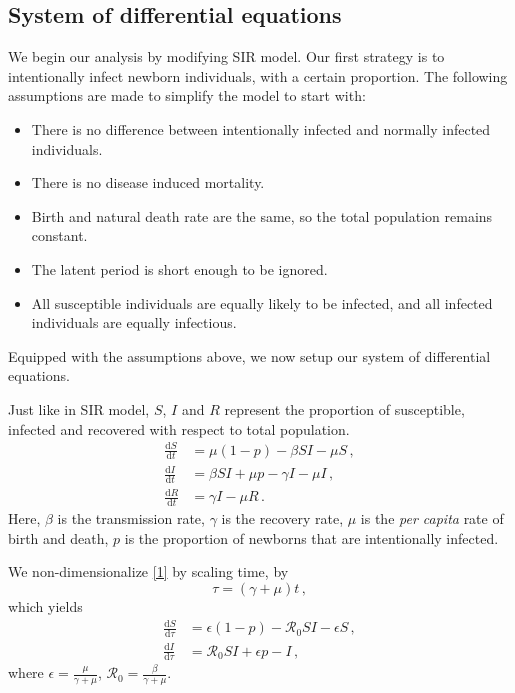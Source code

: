 \documentclass[12pt]{article}
\newcommand\dbyd[2]{\frac{\mathrm d{#1}}{\mathrm d{#2}}}
\newcommand{\R}{\mathcal{R}}
\begin{document}
\subsection{System of differential equations}
We begin our analysis by modifying SIR model. Our first strategy is to intentionally infect newborn individuals, with a certain proportion.  The following assumptions are made to simplify the model to start with:
\begin{itemize}
\item There is no difference between intentionally infected and normally infected individuals.
\item There is no disease induced mortality.
\item Birth and natural death rate are the same, so the total population remains constant.
\item The latent period is short enough to be ignored.
\item All susceptible individuals are equally likely to be infected, and all infected individuals are equally infectious.
\end{itemize}
Equipped with the assumptions above, we now setup our system of differential equations.

Just like in SIR model, $S$, $I$ and $R$ represent the proportion of susceptible, infected and recovered with respect to total population.
\begin{equation}\label{1}
\begin{split}
\dbyd{S}{t}&=\mu(1-p)- \beta SI-\mu S \,,\\
\dbyd{I}{t}&=\beta SI+\mu p-\gamma I -\mu I\,,\\
\dbyd{R}{t}&=\gamma I-\mu R\,.
\end{split}
\end{equation}
Here, $\beta$ is the transmission rate, $\gamma$ is the recovery rate,
$\mu$ is the \emph{per capita} rate of birth and death, $p$ is the
proportion of newborns that are intentionally infected.

We non-dimensionalize \autoref{1} by scaling time, by
\begin{equation}
\tau=(\gamma+\mu)t \,,
\end{equation}
which yields
\begin{subequations}\label{3}
\begin{align}
\dbyd{S}{\tau}&=\epsilon(1-p)- \R_0  SI-\epsilon S \,,\\
\dbyd{I}{\tau}&=\R_0 SI+\epsilon p-I \,,
\end{align}
\end{subequations}
where $\epsilon=\frac{\mu}{\gamma+\mu}$, $\R_0=\frac{\beta}{\gamma+\mu}$.
\end{document}

